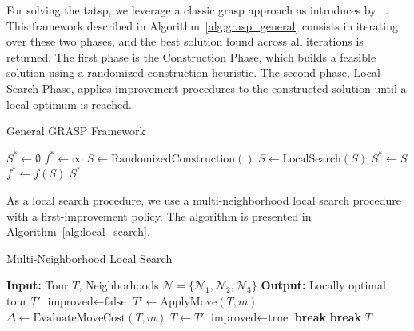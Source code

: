 \documentclass[twocolumn, switch]{article} %
\begin{document}
For solving the \gls{tatsp}, we leverage a classic \gls{grasp} approach as introduces by ~\cite{Feo1995}. 
This framework described in Algorithm~\ref{alg:grasp_general} consists in iterating over these two phases, 
and the best solution found across all iterations is returned. The first phase is the Construction Phase, which builds a feasible
solution using a randomized construction heuristic. The second phase, Local Search Phase, applies improvement procedures to the 
constructed solution until a local optimum is reached. 

\begin{algorithm}
\caption{General GRASP Framework}
\label{alg:grasp_general}
\begin{algorithmic}[1]
\State $S^* \leftarrow \emptyset$ 
\State $f^* \leftarrow \infty$ 
    \State $S \leftarrow \text{RandomizedConstruction}()$
    \State $S \leftarrow \text{LocalSearch}(S)$
        \State $S^* \leftarrow S$
        \State $f^* \leftarrow f(S)$
    \EndIf
\EndFor
\State \Return $S^*$
\end{algorithmic}
\end{algorithm}

As a local search procedure, we use a multi-neighborhood local search procedure with a first-improvement policy.
The algorithm is presented in Algorithm~\ref{alg:local_search}.

\begin{algorithm}
\caption{Multi-Neighborhood Local Search}
\label{alg:local_search}
\begin{algorithmic}[1]
\State \textbf{Input:} Tour $T$, Neighborhoods $\mathcal{N} = \{\mathcal{N}_1, \mathcal{N}_2, \mathcal{N}_3\}$
\State \textbf{Output:} Locally optimal tour $T'$
\Repeat
    \State $\text{improved} \leftarrow \text{false}$
            \State $T' \leftarrow \text{ApplyMove}(T, m)$
            \State $\Delta \leftarrow \text{EvaluateMoveCost}(T, m)$ 
                \State $T \leftarrow T'$
                \State $\text{improved} \leftarrow \text{true}$
                \State \textbf{break} 
            \EndIf
        \EndFor
            \State \textbf{break} 
        \EndIf
    \EndFor
{}
\State \Return $T$
\end{algorithmic}
\end{algorithm}
\end{document}
